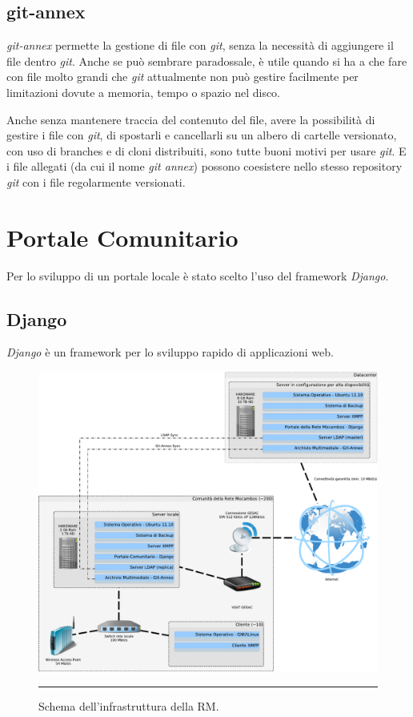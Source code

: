 \subsection{git-annex}
\emph{git-annex} permette la gestione di file con \emph{git}, senza la necessità di
aggiungere il file dentro \emph{git}. Anche se può sembrare paradossale, è
utile quando si ha a che fare con file molto grandi che \emph{git}
attualmente non può gestire facilmente per limitazioni dovute a
memoria, tempo o spazio nel disco.

Anche senza mantenere traccia del contenuto del file, avere la 
possibilità di gestire i file con \emph{git}, di spostarli e cancellarli su un
albero di cartelle versionato, con uso di branches e di cloni
distribuiti, sono tutte buoni motivi per usare \emph{git}. E i file allegati
(da cui il nome \emph{git annex}) possono coesistere nello stesso repository
\emph{git} con i file regolarmente versionati.


\section{Portale Comunitario}
Per lo sviluppo di un portale locale è stato scelto l'uso del
framework \emph{Django}.

\subsection{Django}
\emph{Django} è un framework per lo sviluppo rapido di applicazioni web.


\begin{figure}[htbp]
  \centering
  \includegraphics[width=\textwidth]{./Figure/SchemaServer_ReteMocambos-crop.pdf}
  \rule{35em}{0.5pt}
  \caption[Schema dell'infrastruttura della RM]{Schema dell'infrastruttura della RM.}
  \label{fig:SchemaServer_ReteMocambos}
\end{figure}
